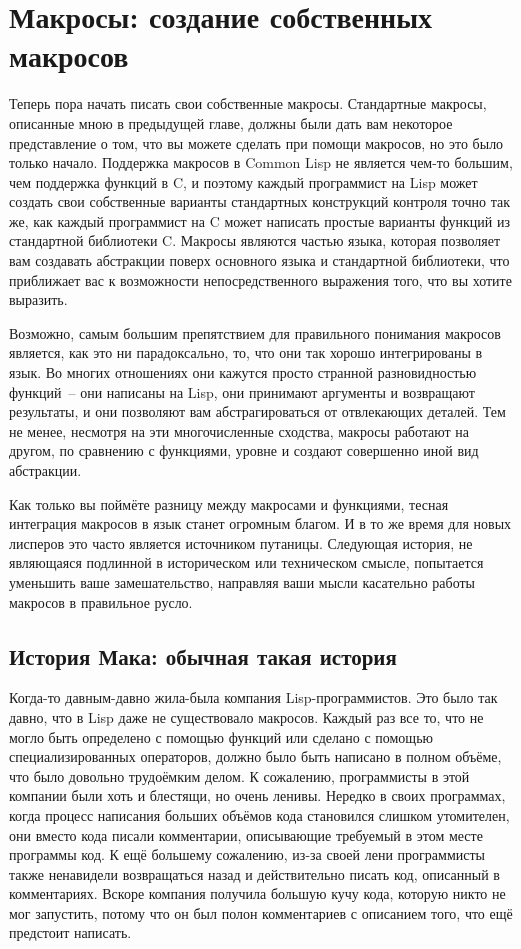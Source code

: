 \chapter{Макросы: создание собственных макросов}
\label{ch:08}

\thispagestyle{empty}

Теперь пора начать писать свои собственные макросы. Стандартные макросы, описанные мною в
предыдущей главе, должны были дать вам некоторое представление о том, что вы можете
сделать при помощи макросов, но это было только начало. Поддержка макросов в Common Lisp
не является чем-то большим, чем поддержка функций в C, и поэтому каждый программист на
Lisp может создать свои собственные варианты стандартных конструкций контроля точно так
же, как каждый программист на C может написать простые варианты функций из стандартной
библиотеки C. Макросы являются частью языка, которая позволяет вам создавать абстракции
поверх основного языка и стандартной библиотеки, что приближает вас к возможности
непосредственного выражения того, что вы хотите выразить.

Возможно, самым большим препятствием для правильного понимания макросов является, как это
ни парадоксально, то, что они так хорошо интегрированы в язык. Во многих отношениях они
кажутся просто странной разновидностью функций~-- они написаны на Lisp, они принимают
аргументы и возвращают результаты, и они позволяют вам абстрагироваться от отвлекающих
деталей. Тем не менее, несмотря на эти многочисленные сходства, макросы работают на
другом, по сравнению с функциями, уровне и создают совершенно иной вид абстракции.

Как только вы поймёте разницу между макросами и функциями, тесная интеграция макросов в
язык станет огромным благом. И в то же время для новых лисперов это часто является
источником путаницы. Следующая история, не являющаяся подлинной в историческом или
техническом смысле, попытается уменьшить ваше замешательство, направляя ваши мысли
касательно работы макросов в правильное русло.

\section{История Мака: обычная такая история}

Когда-то давным-давно жила-была компания Lisp-программистов. Это было так давно, что в
Lisp даже не существовало макросов. Каждый раз все то, что не могло быть определено с
помощью функций или сделано с помощью специализированных операторов, должно было быть
написано в полном объёме, что было довольно трудоёмким делом. К сожалению, программисты в
этой компании были хоть и блестящи, но очень ленивы. Нередко в своих программах, когда
процесс написания больших объёмов кода становился слишком утомителен, они вместо кода
писали комментарии, описывающие требуемый в этом месте программы код. К ещё большему
сожалению, из-за своей лени программисты также ненавидели возвращаться назад и
действительно писать код, описанный в комментариях. Вскоре компания получила большую кучу
кода, которую никто не мог запустить, потому что он был полон комментариев с описанием
того, что ещё предстоит написать.

